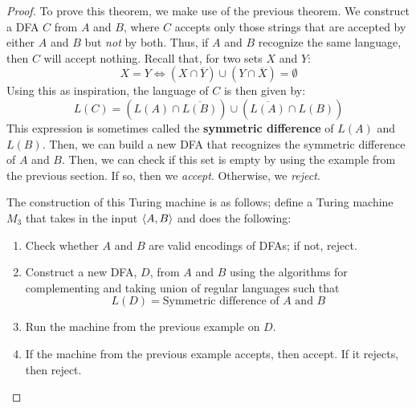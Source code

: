 \documentclass[letterpaper]{article}
\begin{document}
\begin{mdframed}[]
    \begin{proof}
        To prove this theorem, we make use of the previous theorem. We construct a DFA $C$ from $A$ and $B$, where $C$ accepts only those strings that are accepted by either $A$ and $B$ but \emph{not} by both. Thus, if $A$ and $B$ recognize the same language, then $C$ will accept nothing. Recall that, for two sets $X$ and $Y$: 
        \[X = Y \iff \left(X \cap \overline{Y}\right) \cup \left(Y \cap \overline{X}\right) = \emptyset\]
        Using this as inspiration, the language of $C$ is then given by: 
        \[L(C) = \left(L(A) \cap \overline{L(B)}\right) \cup \left(\overline{L(A)} \cap L(B)\right)\]
        This expression is sometimes called the \textbf{symmetric difference} of $L(A)$ and $L(B)$. Then, we can build a new DFA that recognizes the symmetric difference of $A$ and $B$. Then, we can check if this set is empty by using the example from the previous section. If so, then we \emph{accept}. Otherwise, we \emph{reject}.

        \bigskip 

        The construction of this Turing machine is as follows; define a Turing machine $M_3$ that takes in the input $\langle A, B \rangle$ and does the following: 
        \begin{enumerate}
            \item Check whether $A$ and $B$ are valid encodings of DFAs; if not, reject.
            \item Construct a new DFA, $D$, from $A$ and $B$ using the algorithms for complementing and taking union of regular languages such that 
            \[L(D) = \text{Symmetric difference of } A \text{ and } B\]
            \item Run the machine from the previous example on $D$. 
            \item If the machine from the previous example accepts, then accept. If it rejects, then reject. 
        \end{enumerate}
    \end{proof}
\end{mdframed}
\end{document}
